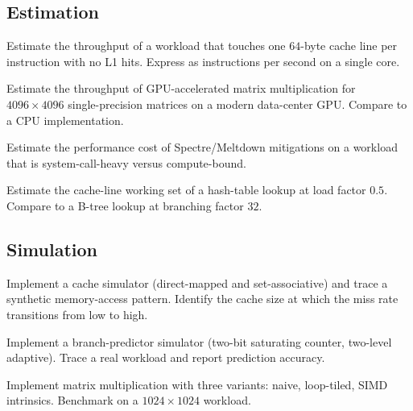 \subsection*{Estimation}

\begin{exercise}
Estimate the throughput of a workload that touches one $64$-byte cache line per instruction with no L1 hits. Express as instructions per second on a single core.
\end{exercise}

\begin{exercise}
Estimate the throughput of GPU-accelerated matrix multiplication for $4096 \times 4096$ single-precision matrices on a modern data-center GPU. Compare to a CPU implementation.
\end{exercise}

\begin{exercise}
Estimate the performance cost of Spectre/Meltdown mitigations on a workload that is system-call-heavy versus compute-bound.
\end{exercise}

\begin{exercise}
Estimate the cache-line working set of a hash-table lookup at load factor $0.5$. Compare to a B-tree lookup at branching factor $32$.
\end{exercise}

\subsection*{Simulation}

\begin{exercise}
Implement a cache simulator (direct-mapped and set-associative) and trace a synthetic memory-access pattern. Identify the cache size at which the miss rate transitions from low to high.
\end{exercise}

\begin{exercise}
Implement a branch-predictor simulator (two-bit saturating counter, two-level adaptive). Trace a real workload and report prediction accuracy.
\end{exercise}

\begin{exercise}
Implement matrix multiplication with three variants: naive, loop-tiled, SIMD intrinsics. Benchmark on a $1024 \times 1024$ workload.
\end{exercise}

